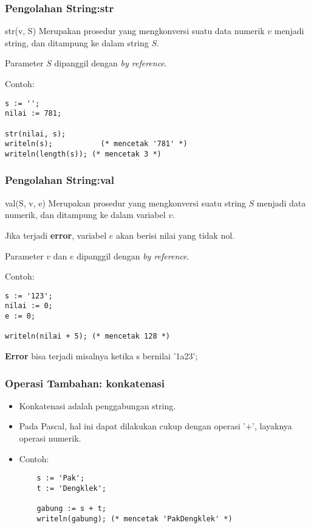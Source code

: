 \documentclass{beamer}
\begin{document}
\begin{frame}[fragile]
\frametitle{Pengolahan String:\newline str}
\begin{block}{str(v, S)}
Merupakan prosedur yang mengkonversi suatu data numerik $v$ menjadi string, dan ditampung ke dalam string $S$.

Parameter $S$ dipanggil dengan \textit{by reference}.
\end{block}
Contoh:
\begin{lstlisting}
s := '';
nilai := 781;

str(nilai, s);
writeln(s);           (* mencetak '781' *)
writeln(length(s)); (* mencetak 3 *)
\end{lstlisting}
\end{frame}

\begin{frame}[fragile]
\frametitle{Pengolahan String:\newline val}
\begin{block}{val(S, v, e)}
Merupakan prosedur yang mengkonversi suatu string $S$ menjadi data numerik, dan ditampung ke dalam variabel $v$.

Jika terjadi \textbf{error}, variabel $e$ akan berisi nilai yang tidak nol.

Parameter $v$ dan $e$ dipanggil dengan \textit{by reference}.
\end{block}
Contoh:
\begin{lstlisting}
s := '123';
nilai := 0;
e := 0;

writeln(nilai + 5); (* mencetak 128 *)
\end{lstlisting}

\textbf{Error} bisa terjadi misalnya ketika s bernilai '1a23';
\end{frame}

\begin{frame}[fragile]
\frametitle{Operasi Tambahan: konkatenasi}
\begin{itemize}
	\item Konkatenasi adalah penggabungan string.
	\item Pada Pascal, hal ini dapat dilakukan cukup dengan operasi '+', layaknya operasi numerik.
	\item Contoh:
	\begin{lstlisting}
	s := 'Pak';
	t := 'Dengklek';
	
	gabung := s + t;
	writeln(gabung); (* mencetak 'PakDengklek' *)
	\end{lstlisting}
\end{itemize}
\end{frame}
\end{document}
